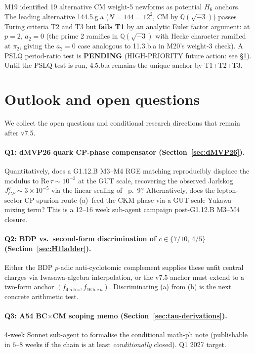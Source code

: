\documentclass[a4paper,11pt]{article}
\newcommand{\fLM}{f_{\text{4.5.b.a}}}
\theoremstyle{definition}
\theoremstyle{remark}
\begin{document}
M19 identified 19 alternative CM weight-5 newforms as potential
$H_6$ anchors.  The leading alternative 144.5.g.a
($N=144=12^2$, CM by $\mathbb{Q}(\sqrt{-3})$) passes
Turing criteria T2 and T3 but \textbf{fails T1} by an analytic
Euler factor argument: at $p=2$, $a_2=0$ (the prime 2 ramifies
in $\mathbb{Q}(\sqrt{-3})$ with Hecke character ramified at
$\pi_2$, giving the $a_2=0$ case analogous to 11.3.b.a in M20's
weight-3 check).  A PSLQ period-ratio test is \textbf{PENDING}
(HIGH-PRIORITY future action: see \S\ref{sec:outlook}).  Until
the PSLQ test is run, 4.5.b.a remains the unique anchor by T1+T2+T3.

\section{Outlook and open questions}
\label{sec:outlook}

We collect the open questions and conditional research
directions that remain after v7.5.

\paragraph{Q1: dMVP26 quark CP-phase compensator
(Section~\ref{sec:dMVP26}).}  Quantitatively, does a
G1.12.B M3--M4 RGE matching reproducibly displace the modulus
to $\mathrm{Re}\,\tau\sim 10^{-3}$ at the GUT scale, recovering
the observed Jarlskog $J_{CP}^{q}\sim 3\times 10^{-5}$ via the
linear scaling of \cite{dMVP26}~p.~9?  Alternatively, does the
lepton-sector CP-spurion route (a)~feed the CKM phase via a
GUT-scale Yukawa-mixing term?  This is a 12--16 week sub-agent
campaign post-G1.12.B M3--M4 closure.

\paragraph{Q2: BDP vs.\ second-form discrimination of
$c\in\{7/10,\,4/5\}$ (Section~\ref{sec:H1ladder}).}  Either
the BDP $p$-adic anti-cyclotomic complement supplies these
unfit central charges via Iwasawa-algebra interpolation, or
the v7.5 anchor must extend to a two-form anchor
$(\fLM, f_{16.5.c.a})$.  Discriminating (a) from (b) is the
next concrete arithmetic test.

\paragraph{Q3: A54 BC$\times$CM scoping memo
(Section~\ref{sec:tau-derivations}).}  4-week Sonnet sub-agent
to formalise the conditional math-ph note (publishable in
6--8 weeks if the chain is at least \emph{conditionally}
closed).  Q1 2027 target.
\end{document}
